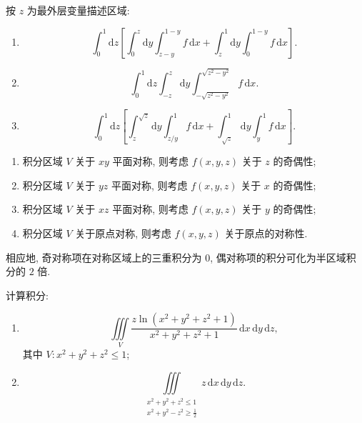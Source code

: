 \begin{solution}
    按 $z$ 为最外层变量描述区域:
    \begin{enumerate}
        \item
              \[
                  \displaystyle\int_0^1\!\mathrm{d}z\left[
                      \int_0^z\!\mathrm{d}y\int_{z-y}^{1-y}f\,\mathrm{d}x
                      +\int_z^1\!\mathrm{d}y\int_0^{1-y}f\,\mathrm{d}x\right].
              \]
        \item
              \[
                  \displaystyle\int_0^1\!\mathrm{d}z\int_{-z}^{z}\!\mathrm{d}y
                  \int_{-\sqrt{z^2-y^2}}^{\sqrt{z^2-y^2}}f\,\mathrm{d}x.
              \]
        \item
              \[
                  \displaystyle\int_0^1\!\mathrm{d}z\left[
                      \int_z^{\sqrt z}\!\mathrm{d}y\int_{z/y}^{1}f\,\mathrm{d}x
                      +\int_{\sqrt z}^{1}\!\mathrm{d}y\int_y^1f\,\mathrm{d}x\right].
              \]
    \end{enumerate}
\end{solution}

\begin{theorem}
    \leavevmode
    \begin{enumerate}
        \item 积分区域 $V$ 关于 $xy$ 平面对称, 则考虑 $f(x,y,z)$ 关于 $z$ 的奇偶性;
        \item 积分区域 $V$ 关于 $yz$ 平面对称, 则考虑 $f(x,y,z)$ 关于 $x$ 的奇偶性;
        \item 积分区域 $V$ 关于 $xz$ 平面对称, 则考虑 $f(x,y,z)$ 关于 $y$ 的奇偶性;
        \item 积分区域 $V$ 关于原点对称, 则考虑 $f(x,y,z)$ 关于原点的对称性.
    \end{enumerate}
    相应地, 奇对称项在对称区域上的三重积分为 $0$, 偶对称项的积分可化为半区域积分的 $2$ 倍.
\end{theorem}

\begin{example}
    计算积分:
    \begin{enumerate}
        \item
              \[
                  \displaystyle\iiint\limits_V\dfrac{z\ln(x^2+y^2+z^2+1)}{x^2+y^2+z^2+1}\,\mathrm{d}x\,\mathrm{d}y\,\mathrm{d}z,
              \]
              其中 $V:x^2+y^2+z^2\leq1$;
        \item
              \[
                  \displaystyle\iiint\limits_{\substack{x^2+y^2+z^2\leq1\\x^2+y^2-z^2\geq\frac{1}{2}}}z\,\mathrm{d}x\,\mathrm{d}y\,\mathrm{d}z.
              \]
    \end{enumerate}
\end{example}
\exampleblank

